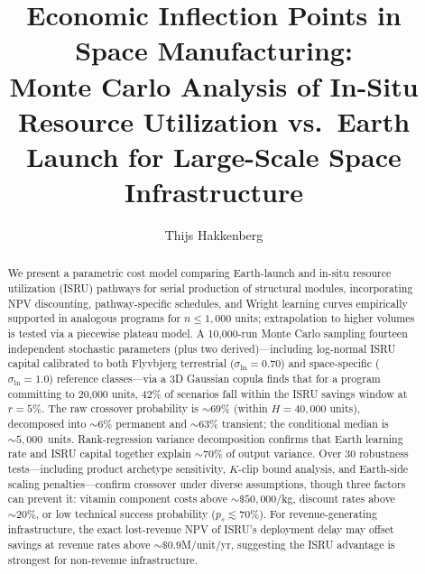 \documentclass[preprint,12pt]{elsarticle}
\begin{document}
\begin{frontmatter}

\title{Economic Inflection Points in Space Manufacturing:\\ Monte Carlo Analysis of In-Situ Resource Utilization vs.\ Earth Launch for Large-Scale Space Infrastructure}

\author[dyson]{Thijs Hakkenberg}

\address[dyson]{Project Dyson, Open Research Initiative}

\begin{abstract}
We present a parametric cost model comparing Earth-launch and in-situ resource utilization (ISRU) pathways for serial production of structural modules, incorporating NPV discounting, pathway-specific schedules, and Wright learning curves empirically supported in analogous programs for $n \leq 1{,}000$ units; extrapolation to higher volumes is tested via a piecewise plateau model. A 10{,}000-run Monte Carlo sampling fourteen independent stochastic parameters (plus two derived)---including log-normal ISRU capital calibrated to both Flyvbjerg terrestrial ($\sigma_{\ln} = 0.70$) and space-specific ($\sigma_{\ln} = 1.0$) reference classes---via a 3D Gaussian copula finds that for a program committing to 20{,}000 units, 42\% of scenarios fall within the ISRU savings window at $r = 5\%$. The raw crossover probability is ${\sim}$69\% (within $H = 40{,}000$ units), decomposed into ${\sim}$6\% permanent and ${\sim}$63\% transient; the conditional median is ${\sim}5{,}000$~units. Rank-regression variance decomposition confirms that Earth learning rate and ISRU capital together explain ${\sim}70\%$ of output variance. Over 30 robustness tests---including product archetype sensitivity, $K$-clip bound analysis, and Earth-side scaling penalties---confirm crossover under diverse assumptions, though three factors can prevent it: vitamin component costs above ${\sim}\$50{,}000$/kg, discount rates above ${\sim}20\%$, or low technical success probability ($p_s \lesssim 70\%$). For revenue-generating infrastructure, the exact lost-revenue NPV of ISRU's deployment delay may offset savings at revenue rates above ${\sim}\$0.9$M/unit/yr, suggesting the ISRU advantage is strongest for non-revenue infrastructure.
\end{abstract}


\end{frontmatter}
\end{document}
